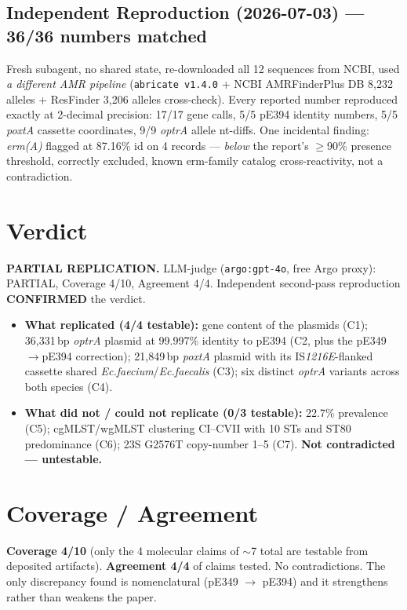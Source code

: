 \documentclass[11pt,letterpaper]{article}
\begin{document}
\subsection{Independent Reproduction (2026-07-03) --- 36/36 numbers matched}
Fresh subagent, no shared state, re-downloaded all 12 sequences from NCBI, used \emph{a different AMR pipeline} (\texttt{abricate v1.4.0} + NCBI AMRFinderPlus DB 8{,}232 alleles + ResFinder 3{,}206 alleles cross-check). Every reported number reproduced exactly at 2-decimal precision: 17/17 gene calls, 5/5 pE394 identity numbers, 5/5 \emph{poxtA} cassette coordinates, 9/9 \emph{optrA} allele nt-diffs. One incidental finding: \emph{erm(A)} flagged at 87.16\% id on 4 records --- \emph{below} the report's $\geq$90\% presence threshold, correctly excluded, known erm-family catalog cross-reactivity, not a contradiction.

\section{Verdict}
\textbf{PARTIAL REPLICATION.} LLM-judge (\texttt{argo:gpt-4o}, free Argo proxy): PARTIAL, Coverage 4/10, Agreement 4/4. Independent second-pass reproduction \textbf{CONFIRMED} the verdict.

\begin{itemize}[leftmargin=*]
\item \textbf{What replicated (4/4 testable):} gene content of the plasmids (C1); 36{,}331\,bp \emph{optrA} plasmid at 99.997\% identity to pE394 (C2, plus the pE349$\to$pE394 correction); 21{,}849\,bp \emph{poxtA} plasmid with its IS\emph{1216E}-flanked cassette shared \emph{Ec.faecium}/\emph{Ec.faecalis} (C3); six distinct \emph{optrA} variants across both species (C4).
\item \textbf{What did not / could not replicate (0/3 testable):} 22.7\% prevalence (C5); cgMLST/wgMLST clustering CI--CVII with 10 STs and ST80 predominance (C6); 23S G2576T copy-number 1--5 (C7). \textbf{Not contradicted --- untestable.}
\end{itemize}

\section{Coverage / Agreement}
\textbf{Coverage 4/10} (only the 4 molecular claims of $\sim$7 total are testable from deposited artifacts). \textbf{Agreement 4/4} of claims tested. No contradictions. The only discrepancy found is nomenclatural (pE349 $\to$ pE394) and it strengthens rather than weakens the paper.
\end{document}
